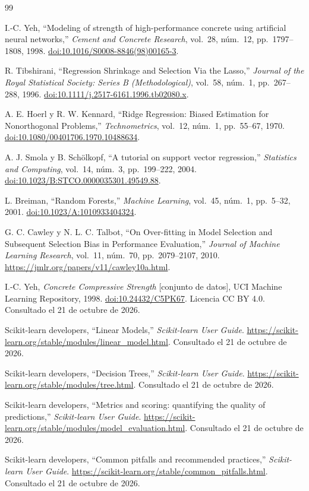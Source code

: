 \begin{thebibliography}{99}

I.-C. Yeh,
``Modeling of strength of high-performance concrete using artificial neural networks,''
\emph{Cement and Concrete Research}, vol.~28, núm.~12,
pp.~1797--1808, 1998.
\href{https://doi.org/10.1016/S0008-8846(98)00165-3}
{doi:10.1016/S0008-8846(98)00165-3}.

R. Tibshirani,
``Regression Shrinkage and Selection Via the Lasso,''
\emph{Journal of the Royal Statistical Society:
Series B (Methodological)}, vol.~58, núm.~1,
pp.~267--288, 1996.
\href{https://doi.org/10.1111/j.2517-6161.1996.tb02080.x}
{doi:10.1111/j.2517-6161.1996.tb02080.x}.

A. E. Hoerl y R. W. Kennard,
``Ridge Regression: Biased Estimation for Nonorthogonal Problems,''
\emph{Technometrics}, vol.~12, núm.~1, pp.~55--67, 1970.
\href{https://doi.org/10.1080/00401706.1970.10488634}
{doi:10.1080/00401706.1970.10488634}.

A. J. Smola y B. Schölkopf,
``A tutorial on support vector regression,''
\emph{Statistics and Computing}, vol.~14, núm.~3,
pp.~199--222, 2004.
\href{https://doi.org/10.1023/B:STCO.0000035301.49549.88}
{doi:10.1023/B:STCO.0000035301.49549.88}.

L. Breiman,
``Random Forests,''
\emph{Machine Learning}, vol.~45, núm.~1, pp.~5--32, 2001.
\href{https://doi.org/10.1023/A:1010933404324}
{doi:10.1023/A:1010933404324}.

G. C. Cawley y N. L. C. Talbot,
``On Over-fitting in Model Selection and Subsequent Selection Bias
in Performance Evaluation,''
\emph{Journal of Machine Learning Research}, vol.~11, núm.~70,
pp.~2079--2107, 2010.
\url{https://jmlr.org/papers/v11/cawley10a.html}.

I.-C. Yeh,
\emph{Concrete Compressive Strength} [conjunto de datos],
UCI Machine Learning Repository, 1998.
\href{https://doi.org/10.24432/C5PK67}{doi:10.24432/C5PK67}.
Licencia CC BY 4.0.
Consultado el 21 de octubre de 2026.

Scikit-learn developers,
``Linear Models,'' \emph{Scikit-learn User Guide}.
\url{https://scikit-learn.org/stable/modules/linear_model.html}.
Consultado el 21 de octubre de 2026.

Scikit-learn developers,
``Decision Trees,'' \emph{Scikit-learn User Guide}.
\url{https://scikit-learn.org/stable/modules/tree.html}.
Consultado el 21 de octubre de 2026.

Scikit-learn developers,
``Metrics and scoring: quantifying the quality of predictions,''
\emph{Scikit-learn User Guide}.
\url{https://scikit-learn.org/stable/modules/model_evaluation.html}.
Consultado el 21 de octubre de 2026.

Scikit-learn developers,
``Common pitfalls and recommended practices,''
\emph{Scikit-learn User Guide}.
\url{https://scikit-learn.org/stable/common_pitfalls.html}.
Consultado el 21 de octubre de 2026.

\end{thebibliography}
